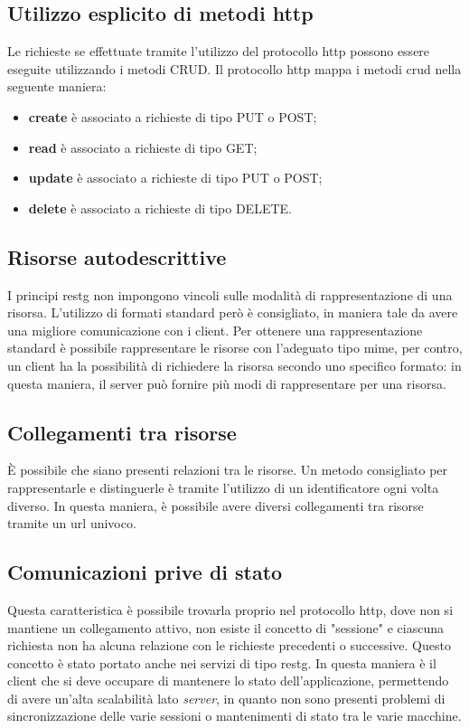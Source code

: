 \subsection{Utilizzo esplicito di metodi \gls{http}}
Le richieste se effettuate tramite l'utilizzo del protocollo \gls{http} possono
essere eseguite utilizzando i metodi CRUD. Il protocollo \gls{http}
mappa i metodi \gls{crud} nella seguente maniera:
\begin{itemize}
	\item \textbf{create} è associato a richieste di tipo PUT o POST;
	\item \textbf{read} è associato a richieste di tipo GET;
	\item \textbf{update} è associato a richieste di tipo PUT o POST;
	\item \textbf{delete} è associato a richieste di tipo DELETE.
\end{itemize}

\subsection{Risorse autodescrittive}
I principi \gls{restg} non impongono vincoli sulle modalità di rappresentazione
di una risorsa. L'utilizzo di formati standard però è consigliato, in maniera
tale da avere una migliore comunicazione con i client. Per ottenere una
rappresentazione standard è possibile rappresentare le risorse con l'adeguato
tipo mime, per contro, un client ha la possibilità di richiedere
la risorsa secondo uno specifico formato: in questa maniera, il server
può fornire più modi di rappresentare per una risorsa.

\subsection{Collegamenti tra risorse}
È possibile che siano presenti relazioni tra le risorse. Un metodo consigliato
per rappresentarle e distinguerle è tramite l'utilizzo di un identificatore
ogni volta diverso.
In questa maniera, è possibile avere diversi collegamenti tra risorse tramite
un \gls{url} univoco.

\subsection{Comunicazioni prive di stato}
Questa caratteristica è possibile trovarla proprio nel protocollo \gls{http},
dove non si mantiene un collegamento attivo, non esiste il concetto di
"sessione" e ciascuna richiesta non ha alcuna relazione con le richieste
precedenti o successive. Questo concetto è stato portato anche nei servizi di
tipo \gls{restg}.
In questa maniera è il client che si deve occupare di mantenere lo
stato dell'applicazione, permettendo di avere un'alta scalabilità lato
\textit{server}, in quanto non sono presenti problemi di sincronizzazione delle
varie sessioni o mantenimenti di stato tra le varie macchine.



